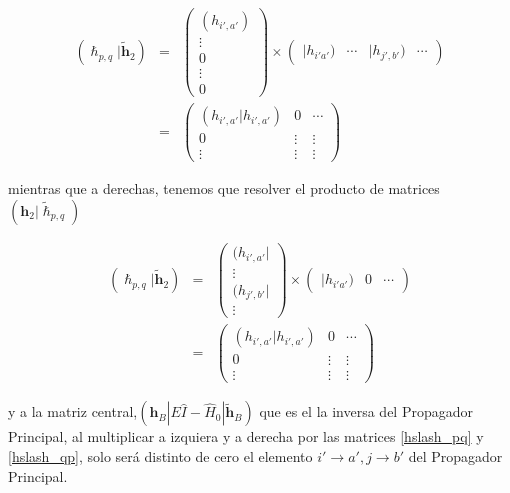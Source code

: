 \documentclass[
	12pt, %
]{fphw}
\begin{document}
\begin{eqnarray} \label{hslash_qp}
	( \bm{\hslash}_{p,q} | \bm{\widetilde{h}}_2 )
		 &=& \begin{pmatrix}
		(h_{i',a'}) \\
		\vdots \\
		0 \\
		\vdots \\
		0
	\end{pmatrix}  \times  \begin{pmatrix}
		|h_{i'a'}) & \cdots & |h_{j',b'}) &  \cdots
	\end{pmatrix}            \\
     & = & \begin{pmatrix}
		 (h_{i',a'} | h_{i',a'}) & 0 & \cdots \\
		 0 & \vdots & \vdots \\
		 \vdots & \vdots & \vdots 
	 \end{pmatrix} 
\end{eqnarray}

mientras que a derechas, tenemos que resolver el producto de matrices 
$( \bm{h}_2 | \widetilde{\bm{\hslash}}_{p,q})$

\begin{eqnarray}\label{hslash_pq}
	( \bm{\hslash}_{p,q} | \bm{\widetilde{h}}_2 )
		 &=& \begin{pmatrix}
		(h_{i',a'}| \\
		 \vdots \\
		(h_{j',b'}| \\
		
		\vdots 
	\end{pmatrix}  \times  \begin{pmatrix}
		|h_{i'a'}) & 0 &  \cdots
	\end{pmatrix}            \\
     & = & \begin{pmatrix}
		 (h_{i',a'} | h_{i',a'}) & 0 & \cdots \\
		 0 & \vdots & \vdots \\
		 \vdots & \vdots & \vdots 
	 \end{pmatrix} 
\end{eqnarray}

y a la matriz central,$(\bm{h}_B| E \hat{I} - \hat{H}_0 | \bm{\widetilde{h}}_B )$ 
que es el la inversa del Propagador Principal, al multiplicar a izquiera y a derecha por las matrices \ref{hslash_pq} y \ref{hslash_qp},
solo será distinto de cero el elemento $i'\rightarrow a', j \rightarrow b'$ del Propagador Principal. 
\end{document}
